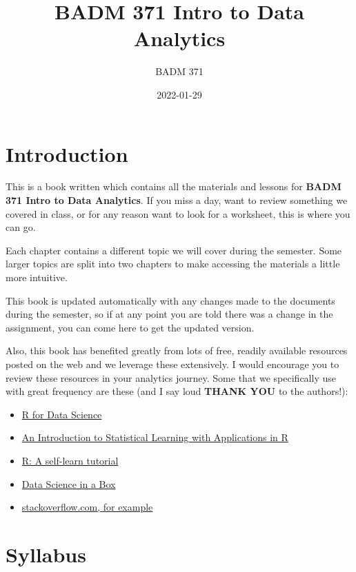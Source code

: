 \documentclass[
]{book}
\title{BADM 371 Intro to Data Analytics}
\author{BADM 371}
\date{2022-01-29}
\providecommand{\tightlist}{%
  \setlength{\itemsep}{0pt}\setlength{\parskip}{0pt}}
\begin{document}
\maketitle

{
\setcounter{tocdepth}{1}
\tableofcontents
}
\hypertarget{introduction}{%
\chapter{Introduction}\label{introduction}}

This is a book written which contains all the materials and lessons for \textbf{BADM 371 Intro to Data Analytics}. If you miss a day, want to review something we covered in class, or for any reason want to look for a worksheet, this is where you can go.

Each chapter contains a different topic we will cover during the semester. Some larger topics are split into two chapters to make accessing the materials a little more intuitive.

This book is updated automatically with any changes made to the documents during the semester, so if at any point you are told there was a change in the assignment, you can come here to get the updated version.

Also, this book has benefited greatly from lots of free, readily available resources posted on the web and we leverage these extensively. I would encourage you to review these resources in your analytics journey. Some that we specifically use with great frequency are these (and I say loud \textbf{THANK YOU} to the authors!):

\begin{itemize}
\tightlist
\item
  \href{https://r4ds.had.co.nz/}{R for Data Science}
\item
  \href{https://trevorhastie.github.io/ISLR/}{An Introduction to Statistical Learning with Applications in R}
\item
  \href{https://gsp.humboldt.edu/olm/R/Tutorials/BestFirstRTutorial.pdf}{R: A self-learn tutorial}
\item
  \href{https://datasciencebox.org/}{Data Science in a Box}
\item
  \href{https://stackoverflow.com/questions/4862178/remove-rows-with-all-or-some-nas-missing-values-in-data-frame?rq=1}{stackoverflow.com, for example}
\end{itemize}

\hypertarget{syllabus}{%
\chapter{Syllabus}\label{syllabus}}
\end{document}
